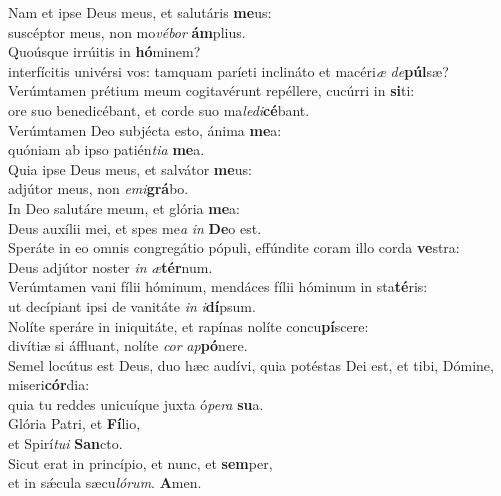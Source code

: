 \evenverse Nam et ipse Deus meus, et salutáris \textbf{me}us:~\*\\
\evenverse suscéptor meus, non mo\textit{vé}\textit{bor} \textbf{ám}plius.\\
\oddverse Quoúsque irrúitis in \textbf{hó}minem?~\*\\
\oddverse interfícitis univérsi vos: tamquam paríeti inclináto et macéri\textit{æ} \textit{de}\textbf{púl}sæ?\\
\evenverse Verúmtamen prétium meum cogitavérunt repéllere, cucúrri in \textbf{si}ti:~\*\\
\evenverse ore suo benedicébant, et corde suo ma\textit{le}\textit{di}\textbf{cé}bant.\\
\oddverse Verúmtamen Deo subjécta esto, ánima \textbf{me}a:~\*\\
\oddverse quóniam ab ipso patién\textit{ti}\textit{a} \textbf{me}a.\\
\evenverse Quia ipse Deus meus, et salvátor \textbf{me}us:~\*\\
\evenverse adjútor meus, non \textit{e}\textit{mi}\textbf{grá}bo.\\
\oddverse In Deo salutáre meum, et glória \textbf{me}a:~\*\\
\oddverse Deus auxílii mei, et spes me\textit{a} \textit{in} \textbf{De}o est.\\
\evenverse Speráte in eo omnis congregátio pópuli, effúndite coram illo corda \textbf{ve}stra:~\*\\
\evenverse Deus adjútor noster \textit{in} \textit{æ}\textbf{tér}num.\\
\oddverse Verúmtamen vani fílii hóminum, mendáces fílii hóminum in sta\textbf{té}ris:~\*\\
\oddverse ut decípiant ipsi de vanitáte \textit{in} \textit{i}\textbf{dí}psum.\\
\evenverse Nolíte speráre in iniquitáte, et rapínas nolíte concu\textbf{pí}scere:~\*\\
\evenverse divítiæ si áffluant, nolíte \textit{cor} \textit{ap}\textbf{pó}nere.\\
\oddverse Semel locútus est Deus, duo hæc audívi, quia potéstas Dei est, et tibi, Dómine, miseri\textbf{cór}dia:~\*\\
\oddverse quia tu reddes unicuíque juxta ó\textit{pe}\textit{ra} \textbf{su}a.\\
\evenverse Glória Patri, et \textbf{Fí}lio,~\*\\
\evenverse et Spirí\textit{tu}\textit{i} \textbf{San}cto.\\
\oddverse Sicut erat in princípio, et nunc, et \textbf{sem}per,~\*\\
\oddverse et in sǽcula sæcu\textit{ló}\textit{rum}. \textbf{A}men.\\
